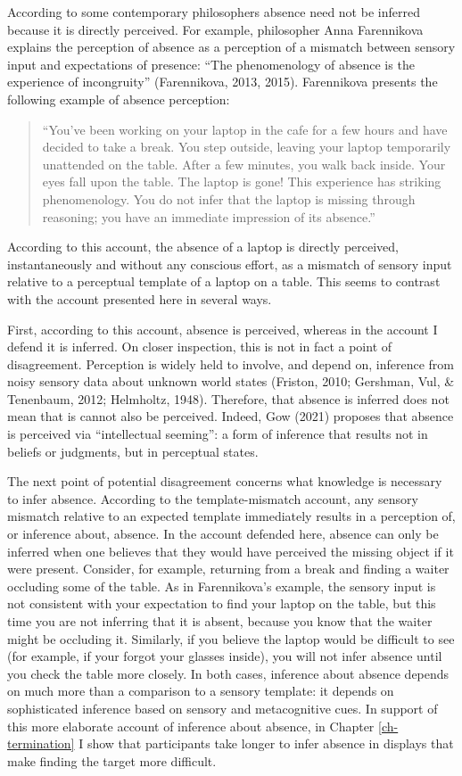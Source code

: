 \documentclass[12pt,twoside]{reedthesis}
\begin{document}
According to some contemporary philosophers absence need not be inferred because it is directly perceived. For example, philosopher Anna Farennikova explains the perception of absence as a perception of a mismatch between sensory input and expectations of presence: ``The phenomenology of absence is the experience of incongruity'' (Farennikova, 2013, 2015). Farennikova presents the following example of absence perception:
\begin{quote}
``You've been working on your laptop in the cafe for a few hours and have decided to take a break. You step outside, leaving your laptop temporarily unattended on the table. After a few minutes, you walk back inside. Your eyes fall upon the table. The laptop is gone! This experience has striking phenomenology. You do not infer that the laptop is missing through reasoning; you have an immediate impression of its absence.''
\end{quote}
According to this account, the absence of a laptop is directly perceived, instantaneously and without any conscious effort, as a mismatch of sensory input relative to a perceptual template of a laptop on a table. This seems to contrast with the account presented here in several ways.

First, according to this account, absence is perceived, whereas in the account I defend it is inferred. On closer inspection, this is not in fact a point of disagreement. Perception is widely held to involve, and depend on, inference from noisy sensory data about unknown world states (Friston, 2010; Gershman, Vul, \& Tenenbaum, 2012; Helmholtz, 1948). Therefore, that absence is inferred does not mean that is cannot also be perceived. Indeed, Gow (2021) proposes that absence is perceived via ``intellectual seeming'': a form of inference that results not in beliefs or judgments, but in perceptual states.

The next point of potential disagreement concerns what knowledge is necessary to infer absence. According to the template-mismatch account, any sensory mismatch relative to an expected template immediately results in a perception of, or inference about, absence. In the account defended here, absence can only be inferred when one believes that they would have perceived the missing object if it were present. Consider, for example, returning from a break and finding a waiter occluding some of the table. As in Farennikova's example, the sensory input is not consistent with your expectation to find your laptop on the table, but this time you are not inferring that it is absent, because you know that the waiter might be occluding it. Similarly, if you believe the laptop would be difficult to see (for example, if your forgot your glasses inside), you will not infer absence until you check the table more closely. In both cases, inference about absence depends on much more than a comparison to a sensory template: it depends on sophisticated inference based on sensory and metacognitive cues. In support of this more elaborate account of inference about absence, in Chapter \ref{ch-termination} I show that participants take longer to infer absence in displays that make finding the target more difficult.
\end{document}

